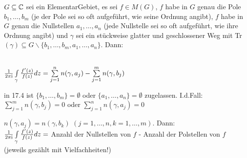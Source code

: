 \documentclass[a4paper,twoside,DIV15,BCOR12mm]{scrbook}
\def\wegint{\ensuremath{\int\limits_\gamma}}
\def\ie{\rm i}
\begin{document}
\begin{satz} 
  $G \subseteq \mathbb{C}$ sei ein ElementarGebiet, es sei $f \in M(G)$, $f$ habe in $G$ genau die
  Pole $b_1, \ldots, b_m$ (je der Pole sei so oft aufgef\"uhrt, wie seine Ordnung
  angibt), $f$ habe in $G$ genau die Nullstellen $a_1, \ldots , a_n$ (jede
  Nullstelle sei so oft aufgef\"uhrt, wie ihre Ordnung angibt) und $\gamma$ sei ein
  st\"uckweise glatter und geschlossener Weg mit Tr$(\gamma) \subseteq G \backslash
  \{b_1, \ldots, b_m, a_1, \ldots, a_n\}$. Dann: \\ \\
  \centerline{$\frac{1}{2 \pi \ie} \wegint \frac{f'(z)}{f(z)} dz =
  \sum\limits_{j=1}^{n} n(\gamma, a_j) - \sum\limits_{j=1}^{m} n(\gamma, b_j)$}
\end{satz}

\begin{bemerkung}
  \begin{liste}
    \item in 17.4 ist $\{b_1,\ldots, b_m\} = \emptyset$ oder $\{a_1,\ldots, a_n\} =
    \emptyset$ zugelassen. I.d.Fall: $ \sum\limits_{j=1}^{m} n(\gamma, b_j) = 0$ oder
    $\sum\limits_{j=1}^{n} n(\gamma, a_j) = 0$
    \item $n(\gamma, a_j) =  n(\gamma, b_k)$ $(j=1,\dots,n, k = 1,\dots,m)$. Dann: \\
    $\frac{1}{2 \pi \ie} \wegint \frac{f'(z)}{f(z)} dz = $ Anzahl der Nullstellen
    von $f$ - Anzahl der Polstellen von $f$ (jeweils gez\"ahlt mit Vielfachheiten!)
  \end{liste}
\end{bemerkung}
\end{document}

